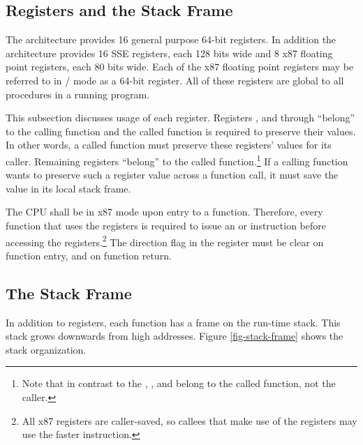 \subsection{Registers and the Stack Frame}
\label{subsec-registers}

The \xARCH architecture provides 16 general purpose 64-bit registers.
In addition the architecture provides 16 SSE registers, each 128 bits
wide and 8 x87 floating point registers, each 80 bits wide.  Each of
the x87 floating point registers may be referred to in \MMX/\threednow
mode as a 64-bit register.  All of these registers are global to all
procedures in a running program.

This subsection discusses usage of each register.  Registers \RBP, \RBX and
 through  ``belong'' to the calling function and the
called function is required to preserve their values.  In other words,
a called function must preserve these registers' values for its
caller.  Remaining registers ``belong'' to the called
function.\footnote{Note that in contrast to the \intelabi, \RDI,
  and \RSI belong to the called function, not the caller.}  If a
calling function wants to preserve such a register value across a
function call, it must save the value in its local stack frame.

The CPU shall be in x87 mode upon entry to a function.  Therefore,
every function that uses the \MMX registers is required to issue
an  or  instruction before accessing the \MMX
registers.\footnote{All x87 registers are caller-saved, so
  callees that make use of the \MMX registers may use the faster
   instruction.}  The direction flag in the 
register must be clear on function entry, and on function return.


\subsection{The Stack Frame}

In addition to registers, each function has a frame on the run-time
stack.  This stack grows downwards from high addresses.  Figure
\ref{fig-stack-frame} shows the stack organization.

